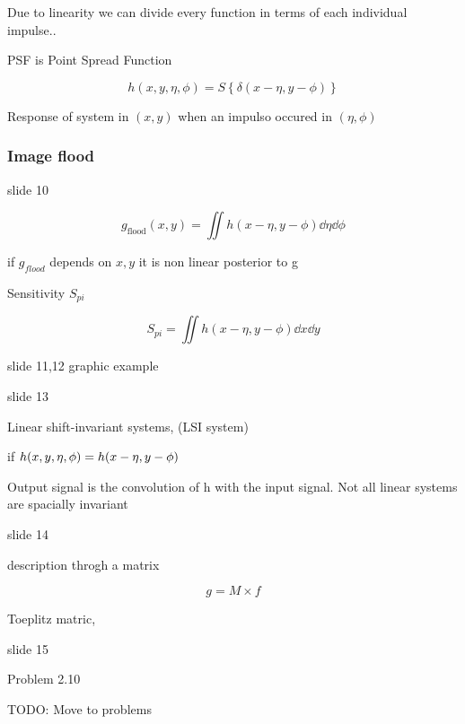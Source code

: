 \documentclass[../main/main.tex]{subfiles}
\begin{document}
Due to linearity we can divide every function in terms of each individual impulse..

PSF is Point Spread Function


\begin{equation}
h(x,y,\eta,\phi) =  S\left\{\delta(x-\eta,y-\phi)\right\}
\end{equation}

Response of system in $(x,y)$ when an impulso occured in $(\eta,\phi)$

\subsubsection{Image flood}

slide 10

\begin{equation}
g_{\textrm{flood}}(x,y) = \iint h(x-\eta,y-\phi) \dd{\eta}\dd{\phi}
\end{equation}

if $g_{flood}$ depends on $x,y$ it is non linear posterior to g

Sensitivity $S_{pi}$

\begin{equation}
S_{pi} = \iint h(x-\eta,y-\phi) \dd{x}\dd{y}
\end{equation}

slide 11,12 graphic example


slide 13

Linear shift-invariant systems, (LSI system)

if $h(x,y,\eta,\phi) = h(x-\eta, y-\phi)$

Output signal is the convolution of h with the input signal. Not all linear systems are spacially invariant

slide 14

description throgh a matrix

\begin{equation}
g = M\times f
\end{equation}

Toeplitz matric,



slide 15

Problem 2.10

TODO: Move to problems
\end{document}
